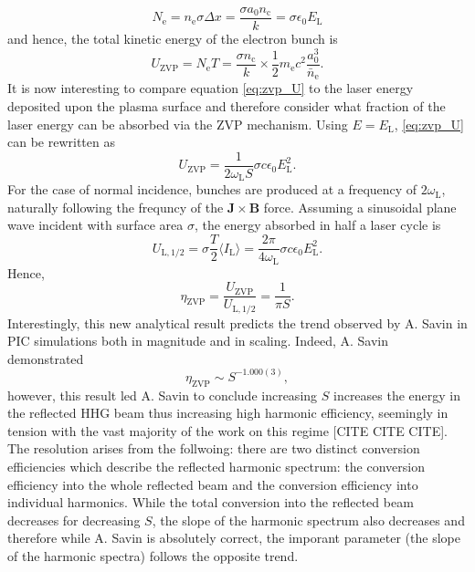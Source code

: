 \begin{equation}\label{eq:zvp-Ne}
	N_\mathrm{e} = n_\mathrm{e} \sigma \Delta x = \frac{\sigma a_0 n_\mathrm{c}}{k}  = \sigma \epsilon_0 E_\mathrm{L}
\end{equation}
and hence, the total kinetic energy of the electron bunch is
\begin{equation}\label{eq:zvp_U}
	U_\mathrm{ZVP} = N_\mathrm{e} T = \frac{\sigma n_\mathrm{c}}{k}\times \frac{1}{2}m_\mathrm{e}c^2 \frac{a^3_0}{\bar{n}_\mathrm{e}}.
\end{equation}
It is now interesting to compare equation \ref{eq:zvp_U} to the laser energy deposited upon the plasma surface and therefore consider what fraction of the laser energy can be absorbed via the \ac{ZVP} mechanism. Using $E = E_\mathrm{L}$, \ref{eq:zvp_U} can be rewritten as
\begin{equation}
	U_\mathrm{ZVP} = \frac{1}{2\omega_\mathrm{L} S}\sigma c \epsilon_0 E^2_\mathrm{L}.
\end{equation}
For the case of normal incidence, bunches are produced at a frequency of $2\omega_\mathrm{L}$, naturally following the frequncy of the $\mathbf{J}\times \mathbf{B}$ force. Assuming a sinusoidal plane wave incident with surface area $\sigma$, the energy absorbed in half a laser cycle is
\begin{equation}
	 U_\mathrm{L,1/2} = \sigma \frac{T}{2}\langle I_\mathrm{L}\rangle = \frac{2\pi}{4\omega_\mathrm{L}}\sigma c\epsilon_0E^2_\mathrm{L}.
\end{equation}
Hence,
\begin{equation}
	\eta_\mathrm{ZVP} = \frac{U_\mathrm{ZVP}}{U_\mathrm{L,1/2}} = \frac{1}{\pi S}.
\end{equation}
Interestingly, this new analytical result predicts the trend observed by A. Savin \cite{savinModellingLaserPlasmaInteractions2019} in \ac{PIC} simulations both in magnitude and in scaling. Indeed, A. Savin demonstrated 
\begin{equation}
	\eta_\mathrm{ZVP} \sim S^{-1.000(3)},
\end{equation}
however, this result led A. Savin to conclude increasing $S$ increases the energy in the reflected \ac{HHG} beam thus increasing high harmonic efficiency, seemingly in tension with the vast majority of the work on this regime [CITE CITE CITE]. The resolution arises from the follwoing: there are two distinct conversion efficiencies which describe the reflected harmonic spectrum: the conversion efficiency into the whole reflected beam and the conversion efficiency into individual harmonics. While the total conversion into the reflected beam decreases for decreasing $S$, the slope of the harmonic spectrum also decreases and therefore while A. Savin is absolutely correct, the imporant parameter (the slope of the harmonic spectra) follows the opposite trend.

